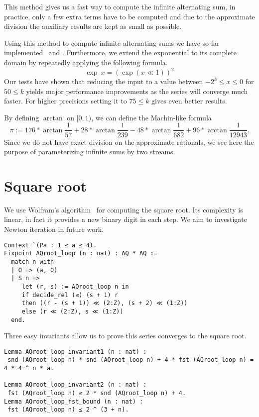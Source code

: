\documentclass[a4paper,10pt,runningheads]{llncs}
\begin{document}
This method gives us a fast way to compute the infinite alternating sum, in practice, only a few extra terms have to be computed and due to the approximate division the auxiliary results are kept as small as possible.

Using this method to compute infinite alternating sums we have so far implemented \exp\ and \arctan. Furthermore, we extend the exponential to its complete domain by repeatedly applying the following formula.
\begin{equation}
	\exp\ x = (\exp (x ≪ 1))^2 \label{equation:exp_squaring}
\end{equation}
Our tests have shown that reducing the input to a value between $-2^k ≤ x ≤ 0$ for $50 ≤ k$ yields major performance improvements as the series will converge much faster. For higher precisions setting it to $75 ≤ k$ gives even better results.

By defining $\arctan$ on $[0,1)$, we can define the Machin-like formula
\[
	\pi := 176 * \arctan \frac{1}{57} + 28 * \arctan \frac{1}{239} 
		- 48 * \arctan \frac{1}{682} + 96 * \arctan \frac{1}{12943}.
\]
Since we do not have exact division on the approximate rationals, we see here the purpose of parameterizing infinite sums by two streams.

\section{Square root}\label{section:Wolfram}
We use Wolfram's algorithm~\cite[p.913]{wolfram2002new} for computing the square root. Its complexity is linear, in fact it provides a new binary digit in each step. We aim to investigate Newton iteration in future work.
\begin{lstlisting}
Context `(Pa : 1 ≤ a ≤ 4).
Fixpoint AQroot_loop (n : nat) : AQ * AQ :=
  match n with
  | O => (a, 0)
  | S n =>
     let (r, s) := AQroot_loop n in
     if decide_rel (≤) (s + 1) r
     then ((r - (s + 1)) ≪ (2:Z), (s + 2) ≪ (1:Z))
     else (r ≪ (2:Z), s ≪ (1:Z))
  end.
\end{lstlisting}
Three easy invariants allow us to prove this series converges to the square root.
\begin{lstlisting}
Lemma AQroot_loop_invariant1 (n : nat) :
 snd (AQroot_loop n) * snd (AQroot_loop n) + 4 * fst (AQroot_loop n) = 4 * 4 ^ n * a.

Lemma AQroot_loop_invariant2 (n : nat) :
 fst (AQroot_loop n) ≤ 2 * snd (AQroot_loop n) + 4.
Lemma AQroot_loop_fst_bound (n : nat) :
 fst (AQroot_loop n) ≤ 2 ^ (3 + n).
\end{lstlisting}
 
\end{document}
